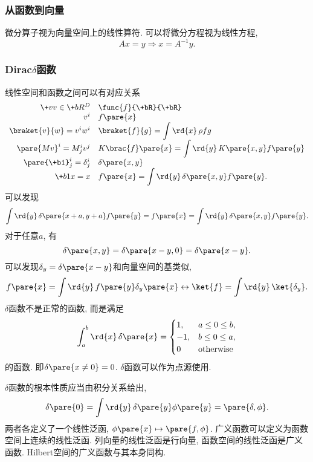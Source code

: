 \documentclass[hidelinks]{ctexart}
\begin{document}
\subsubsection{从函数到向量} %
\label{ssub:从函数到向量}

\newpoint{}微分算子视为向量空间上的线性算符.
\newpoint{}可以将微分方程视为线性方程,
\[ Ax = y \Rightarrow x = A^{-1}y. \]


\subsubsection{Dirac\texorpdfstring{$\delta$}{delta}函数} %
\label{ssub:diracdelta_函数}

线性空间和函数之间可以有对应关系
\[ \begin{array}{rl}
    \+vv\in \+bR^D & \func{f}{\+bR}{\+bR} \\
    v^i & f\pare{x} \\
    \braket{v}{w} = v^i w^i & \braket{f}{g} = \displaystyle \int \rd{x}\,\rho fg \\
    \pare{Mv}^i = M_j^i v^j & K\brac{f}\pare{x} = \displaystyle \int \rd{y}\, K\pare{x,y} f\pare{y} \\
    \pare{\+b1}_j^i = \delta_j^i & \delta\pare{x,y} \\
    \+b1 x = x & f\pare{x} = \displaystyle \int \rd{y}\, \delta\pare{x,y} f\pare{y}.
\end{array} \]
可以发现
\[ \int \rd{y}\, \delta\pare{x+a,y+a}f\pare{y} = f\pare{x} = \int \rd{y}\, \delta\pare{x,y}f\pare{y}. \]
对于任意$a$, 有
\[ \delta\pare{x,y} = \delta\pare{x-y, 0} = \delta\pare{x-y}. \]
可以发现$\delta_y = \delta\pare{x-y}$和向量空间的基类似,
\[ f\pare{x} = \int \rd{y}\, f\pare{y}\delta_y\pare{x} \leftrightarrow \ket{f} = \int \rd{y}\, \ket{\delta_y}. \]
$\delta$函数不是正常的函数, 而是满足
\[ \int_a^b \rd{x}\, \delta\pare{x} = \begin{cases}
    1, & a\le 0 \le b, \\
    -1, & b\le 0 \le a, \\
    0 & \mathrm{otherwise}
\end{cases} \]
的函数. 即$\delta\pare{x\neq 0} = 0$. $\delta$函数可以作为点源使用.
\par
$\delta$函数的根本性质应当由积分关系给出,
\[ \delta\pare{0} = \int \rd{y}\, \delta\pare{y}\phi\pare{y} = \pare{\delta, \phi}. \]
两者各定义了一个线性泛函, $\phi\pare{x} \mapsto \pare{f,\phi}$. 广义函数可以定义为函数空间上连续的线性泛函. 列向量的线性泛函是行向量, 函数空间的线性泛函是广义函数. Hilbert空间的广义函数与其本身同构.
\end{document}
